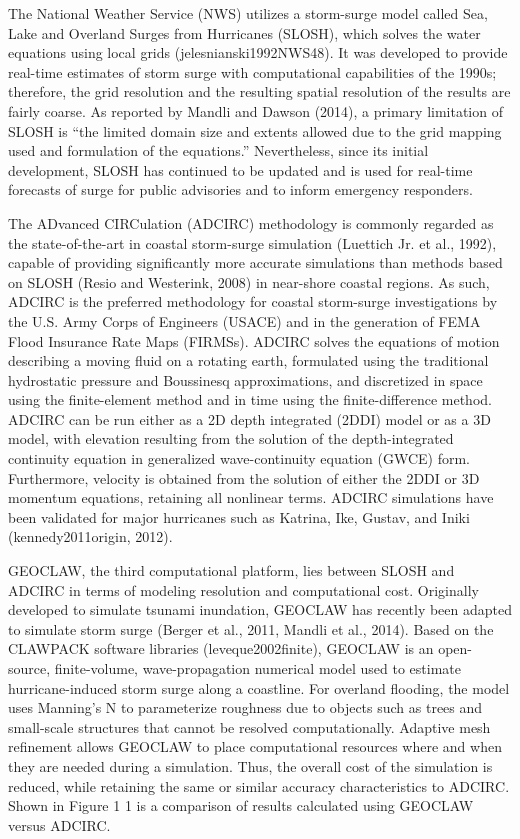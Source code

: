 The National Weather Service (NWS) utilizes a storm-surge model called Sea, Lake and Overland Surges from Hurricanes (SLOSH), which solves the water equations using local grids (jelesnianski1992NWS48). It was developed to provide real-time estimates of storm surge with computational capabilities of the 1990s; therefore, the grid resolution and the resulting spatial resolution of the results are fairly coarse. As reported by Mandli and Dawson (2014), a primary limitation of SLOSH is “the limited domain size and extents allowed due to the grid mapping used and formulation of the equations.” Nevertheless, since its initial development, SLOSH has continued to be updated and is used for real-time forecasts of surge for public advisories and to inform emergency responders.

The ADvanced CIRCulation (ADCIRC) methodology is commonly regarded as the state-of-the-art in coastal storm-surge simulation (Luettich Jr. et al., 1992), capable of providing significantly more accurate simulations than methods based on SLOSH (Resio and Westerink, 2008) in near-shore coastal regions. As such, ADCIRC is the preferred methodology for coastal storm-surge investigations by the U.S. Army Corps of Engineers (USACE) and in the generation of FEMA Flood Insurance Rate Maps (FIRMSs). ADCIRC solves the equations of motion describing a moving fluid on a rotating earth, formulated using the traditional hydrostatic pressure and Boussinesq approximations, and discretized in space using the finite-element method and in time using the finite-difference method. ADCIRC can be run either as a 2D depth integrated (2DDI) model or as a 3D model, with elevation resulting from the solution of the depth-integrated continuity equation in generalized wave-continuity equation (GWCE) form. Furthermore, velocity is obtained from the solution of either the 2DDI or 3D momentum equations, retaining all nonlinear terms. ADCIRC simulations have been validated for major hurricanes such as Katrina, Ike, Gustav, and Iniki (kennedy2011origin, 2012). 

GEOCLAW, the third computational platform, lies between SLOSH and ADCIRC in terms of modeling resolution and computational cost. Originally developed to simulate tsunami inundation, GEOCLAW has recently been adapted to simulate storm surge (Berger et al., 2011, Mandli et al., 2014). Based on the CLAWPACK software libraries (leveque2002finite), GEOCLAW is an open-source, finite-volume, wave-propagation numerical model used to estimate hurricane-induced storm surge along a coastline. For overland flooding, the model uses Manning's N to parameterize roughness due to objects such as trees and small-scale structures that cannot be resolved computationally. Adaptive mesh refinement allows GEOCLAW to place computational resources where and when they are needed during a simulation. Thus, the overall cost of the simulation is reduced, while retaining the same or similar accuracy characteristics to ADCIRC. Shown in Figure 1 1 is a comparison of results calculated using GEOCLAW versus ADCIRC. 
\newline


